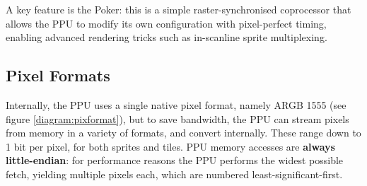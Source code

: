 \documentclass[notitlepage]{article}
\begin{document}
A key feature is the Poker: this is a simple raster-synchronised coprocessor that allows the PPU to modify its own configuration with pixel-perfect timing, enabling advanced rendering tricks such as in-scanline sprite multiplexing.

\subsection{Pixel Formats}

Internally, the PPU uses a single native pixel format, namely ARGB 1555 (see figure \ref{diagram:pixformat}), but to save bandwidth, the PPU can stream pixels from memory in a variety of formats, and convert internally. These range down to 1 bit per pixel, for both sprites and tiles. PPU memory accesses are \textbf{always little-endian}: for performance reasons the PPU performs the widest possible fetch, yielding multiple pixels each, which are numbered least-significant-first.
\end{document}
